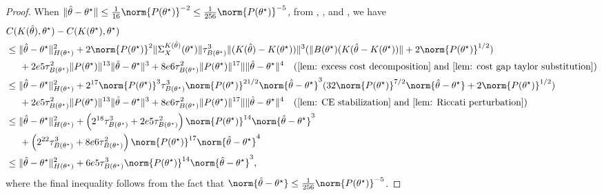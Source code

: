 \begin{proof}
    When $\|\hat\theta - \theta^\star\|\leq\frac{1}{16}\norm{P(\theta^\star)}^{-2}\leq \frac{1}{256} \norm{P(\theta^\star)}^{-5}$, 
    from , ,  and , we have
    \begin{align*}
        &C(K(\hat\theta), \theta^\star) - C(K(\theta^\star), \theta^\star)\\ 
        &\leq \|\hat\theta - \theta^\star\|_{H(\theta^\star)}^2 + 2 \norm{P(\theta^\star)}^2 \|\Sigma_X^{K(\hat\theta)}(\theta^\star)\|\tau_{B(\theta^\star)}^3\|(K(\hat{\theta})-K(\theta^\star))\|^3(\|B(\theta^\star)(K(\hat\theta-K(\theta^\star))\| + 2 \norm{P(\theta^\star)}^{1/2}) \\
        &\hspace{5mm}+ 2e5\tau_{B(\theta^\star)}^2\|P(\theta^\star)\|^{13}\|\hat\theta-\theta^\star\|^3 
        + 8e6\tau_{B(\theta^\star)}^2\|P(\theta^\star
        )\|^{17}\|\|\hat\theta-\theta^\star\|^4 \quad \mbox{(\Cref{lem: excess cost decomposition} and \Cref{lem: cost gap taylor substitution})} \\
        &\leq \|\hat\theta - \theta^\star\|_{H(\theta^\star)}^2 + 2^{17} \norm{P(\theta^\star)}^3\tau_{B(\theta^\star)}^3
        \norm{P(\theta^\star)}^{21/2} \norm{\hat\theta-\theta^\star}^3
        (32\norm{P(\theta^\star)}^{7/2} \norm{\hat\theta-\theta^\star} + 2 \norm{P(\theta^\star)}^{1/2}) \\
        &\hspace{5mm}+ 2e5\tau_{B(\theta^\star)}^2\|P(\theta^\star)\|^{13}\|\hat\theta-\theta^\star\|^3 
        + 8e6\tau_{B(\theta^\star)}^2\|P(\theta^\star
        )\|^{17}\|\|\hat\theta-\theta^\star\|^4 \quad \mbox{(\Cref{lem: CE stabilization} and \Cref{lem: Riccati perturbation})}\\
        &\leq \|\hat\theta - \theta^\star\|_{H(\theta^\star)}^2 + 
        \left(
        2^{18}\tau_{B(\theta^\star)}^3 + 2e5\tau_{B(\theta^\star)}^2
        \right)\norm{P(\theta^\star)}^{14}\norm{\hat\theta-\theta^\star}^3 \\
        &\hspace{5mm}+ \left(
        2^{22}\tau_{B(\theta^\star)}^3 + 8e6\tau_{B(\theta^\star)}^2
        \right)\norm{P(\theta^\star)}^{17}\norm{\hat\theta-\theta^\star}^4\\
        &\leq  \|\hat\theta - \theta^\star\|_{H(\theta^\star)}^2 +     6e5\tau_{B(\theta^\star)}^3\norm{P(\theta^\star)}^{14}\norm{\hat\theta-\theta^\star}^3, 
    \end{align*}
    where the final inequality follows from the fact that $\norm{\hat\theta-\theta^\star}\leq \frac{1}{256}\norm{P(\theta^\star)}^{-5}$.
\end{proof}

